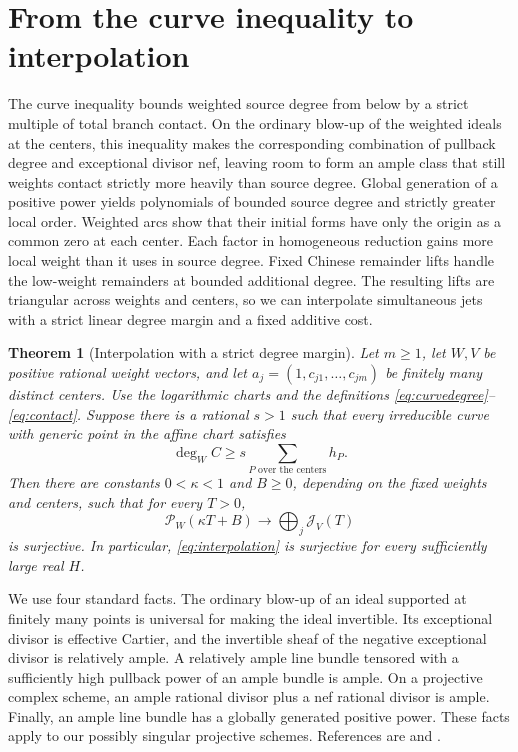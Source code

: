 \documentclass[11pt]{article}
\newtheorem{theorem}{Theorem}[section]
\theoremstyle{definition}
\theoremstyle{remark}
\newcommand{\Pcal}{\mathcal P}
\newcommand{\Jcal}{\mathcal J}
\numberwithin{equation}{section}
\begin{document}
\section{From the curve inequality to interpolation}\label{sec:bridge}
The curve inequality bounds weighted source degree from below by a
strict multiple of total branch contact. On the ordinary blow-up of the
weighted ideals at the centers, this inequality makes the corresponding
combination of pullback degree and exceptional divisor nef, leaving room
to form an ample class that still weights contact strictly more heavily
than source degree. Global generation of a positive power yields
polynomials of bounded source degree and strictly greater local order.
Weighted arcs show that their initial forms have only the origin as a
common zero at each center. Each factor in homogeneous reduction gains
more local weight than it uses in source degree. Fixed Chinese remainder
lifts handle the low-weight remainders at bounded additional degree.
The resulting lifts are triangular across weights and centers, so
we can interpolate simultaneous jets with a strict linear degree
margin and a fixed additive cost.

\begin{samepage}
\begin{theorem}[Interpolation with a strict degree margin]\label{thm:bridge}
Let \(m\ge1\), let \(W,V\) be positive rational weight vectors, and
let \(a_j=(1,c_{j1},\ldots,c_{jm})\) be finitely many distinct centers.
Use the logarithmic charts and the definitions
\eqref{eq:curvedegree}--\eqref{eq:contact}. Suppose there is a rational
\(s>1\) such that every irreducible curve with generic point in the
affine chart satisfies
\begin{equation}\label{eq:generalCI}
 \deg_W C\ge s\sum_{P\text{ over the centers}}h_P.
\end{equation}
Then there are constants \(0<\kappa<1\) and \(B\ge0\), depending
on the fixed weights and centers, such that for every \(T>0\),
\begin{equation}\label{eq:margininterpolation}
 \Pcal_W(\kappa T+B)\longrightarrow\bigoplus_j\Jcal_V(T)
\end{equation}
is surjective. In particular, \eqref{eq:interpolation} is surjective
for every sufficiently large real \(H\).
\end{theorem}
\end{samepage}

We use four standard facts. The ordinary blow-up of an ideal
supported at finitely many points is universal for making the ideal
invertible. Its exceptional divisor is effective Cartier, and the
invertible sheaf of the negative exceptional divisor is relatively
ample. A relatively ample line bundle tensored with a sufficiently high
pullback power of an ample bundle is ample. On a projective complex
scheme, an ample rational divisor plus a nef rational divisor is ample.
Finally, an ample line bundle has a globally generated positive power.
These facts apply to our possibly singular projective schemes. References are
\cite[Sections 28.27, 29.38, 31.33]{stacks} and
\cite[Corollary 1.4.10]{lazarsfeld}.
\end{document}
